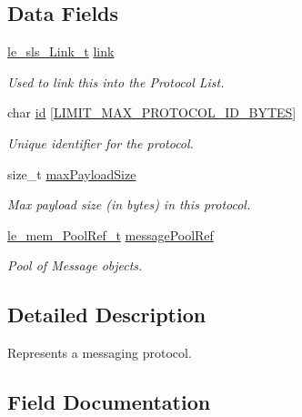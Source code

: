 \subsection*{Data Fields}
\begin{DoxyCompactItemize}
\item 
\hyperlink{structle__sls___link__t}{le\+\_\+sls\+\_\+\+Link\+\_\+t} \hyperlink{structmsg_protocol___protocol__t_a4060449fd5f4871ae1c94946e2de4768}{link}
\begin{DoxyCompactList}\small\item\em Used to link this into the Protocol List. \end{DoxyCompactList}\item 
char \hyperlink{structmsg_protocol___protocol__t_ab704e938d2a578754db17ce96fc1cd67}{id} \mbox{[}\hyperlink{limit_8h_ab51f3f9c6e3da08206cfd964b48d3e60}{L\+I\+M\+I\+T\+\_\+\+M\+A\+X\+\_\+\+P\+R\+O\+T\+O\+C\+O\+L\+\_\+\+I\+D\+\_\+\+B\+Y\+T\+ES}\mbox{]}
\begin{DoxyCompactList}\small\item\em Unique identifier for the protocol. \end{DoxyCompactList}\item 
size\+\_\+t \hyperlink{structmsg_protocol___protocol__t_ad3dbf309dd7ad22ad1bd909c30da197a}{max\+Payload\+Size}
\begin{DoxyCompactList}\small\item\em Max payload size (in bytes) in this protocol. \end{DoxyCompactList}\item 
\hyperlink{le__mem_8h_a44a896f6a0a1a8c733e8038eb332989e}{le\+\_\+mem\+\_\+\+Pool\+Ref\+\_\+t} \hyperlink{structmsg_protocol___protocol__t_a94ada262e44b7aad2f0bbed25db09fa3}{message\+Pool\+Ref}
\begin{DoxyCompactList}\small\item\em Pool of Message objects. \end{DoxyCompactList}\end{DoxyCompactItemize}


\subsection{Detailed Description}
Represents a messaging protocol. 

\subsection{Field Documentation}
